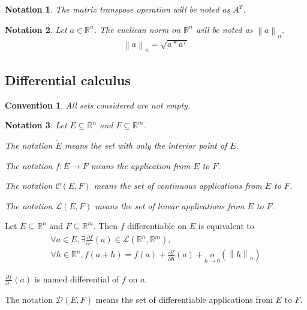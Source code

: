 \documentclass[11pt,en]{elegantpaper}
\newtheorem{convention}{Convention}
\newtheorem{notation}{Notation}
\newcommand\norm[1]{\left\lVert#1\right\rVert}
\begin{document}
\begin{notation}
  The matrix transpose operation will be noted as $A^T$.
\end{notation}

\begin{notation}
  Let $a \in \mathbb{R}^n$. The eucliean norm on $\mathbb{R}^n$ will be noted as $\norm a _n$.
  \begin{gather*}
    \norm a _n = \sqrt{a * a^T}
  \end{gather*}
\end{notation}

\subsection{Differential calculus}

\begin{convention}
  All sets considered are not empty.
\end{convention}

\begin{notation}
  Let $E \subseteq \mathbb{R}^n$ and $F \subseteq \mathbb{R}^m$. \par
  The notation $\mathring{E}$ means the set with only the interior point of $E$. \par
  The notation $f : E \longrightarrow F$ means the application from $E$ to $F$. \par
  The notation $\mathcal{C}(E,F)$ means the set of continuous applications from $E$ to $F$. \par
  The notation $\mathcal{L}(E,F)$ means the set of linear applications from $E$ to $F$.
\end{notation}

\begin{definition}
  Let $E \subseteq \mathbb{R}^n$ and $F \subseteq \mathbb{R}^m$.
  Then $f$ differentiable on $E$ is equivalent to \begin{equation}\label{eq:differentiable}
    \begin{gathered}
      \forall a \in \mathring{E}, \exists \frac{\partial f}{\partial \cdot}(a) \in \mathcal{L}(\mathbb{R}^n,\mathbb{R}^m), \\
      \forall h \in \mathbb{R}^n, f(a+h) = f(a) + \frac{\partial f}{\partial h}(a) + \underset{h \to 0}o(\norm h _n)
    \end{gathered}
  \end{equation}

  $\frac{\partial f}{\partial \cdot}(a)$ is named differential of $f$ on $a$. \par
  The notation $\mathcal{D}(E,F)$ means the set of differentiable applications from $E$ to $F$.
\end{definition}
\end{document}
